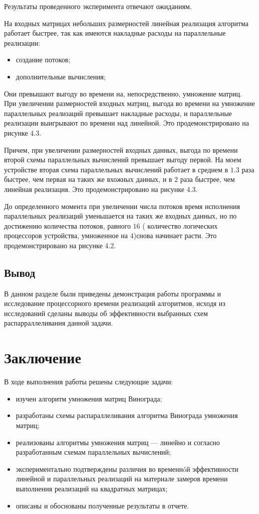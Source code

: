 \documentclass[12pt]{report}
\begin{document}
\newpage

Результаты проведенного эксперимента отвечают ожиданиям. 

На входных матрицах небольших размерностей линейная реализация алгоритма работает быстрее, так как имеются накладные расходы на параллельные реализации:
\begin{itemize}
	\item создание потоков;
	\item дополнительные вычисления;
\end{itemize}

Они превышают выгоду во времени на, непосредственно, умножение матриц. При увеличении размерностей входных матриц, выгода во времени на умножение параллельных реализаций превышает накладные расходы, и параллельные реализации выигрывают по времени над линейной. Это продемонстрировано на рисунке 4.3. 

Причем, при увеличении размерностей входных данных, выгода по времени второй схемы параллельных вычислений превышает выгоду первой. На моем устройстве вторая схема параллельных вычислений работает в среднем в $1.3$ раза быстрее, чем первая на таких же вхожных данных, и в $2$ раза быстрее, чем линейная реализация. Это продемонстрировано на рисунке 4.3. 

До определенного момента при увеличении числа потоков время исполнения параллельных реализаций уменьшается на таких же входных данных, но по достижению количества потоков, равного $16$ ( количество логических процессоров устройства, умноженное на 4)снова начинает расти. Это продемонстрировано на рисунке 4.2.

\newpage

\section{Вывод}

В данном разделе были приведены демонстрация работы программы и исследование процессорного времени реализаций алгоритмов, исходя из исследований сделаны выводы об эффективности выбранных схем распарраллеливания данной задачи.


\chapter*{Заключение}

В ходе выполнения работы решены следующие задачи:
\begin{itemize}
	\item изучен алгоритм умножения матриц Винограда;
	\item разработаны схемы распараллеливания алгоритма Винограда умножения матриц; 
	\item реализованы алгоритмы умножения матриц --- линейно и согласно разработанным схемам параллельных вычислений;
	\item экспериментально подтверждены различия во временнóй эффективности линейной и параллельных реализаций на материале замеров времени выполнения реализаций на квадратных матрицах;
	\item описаны и обоснованы полученные результаты в отчете.
\end{itemize}
\end{document}

